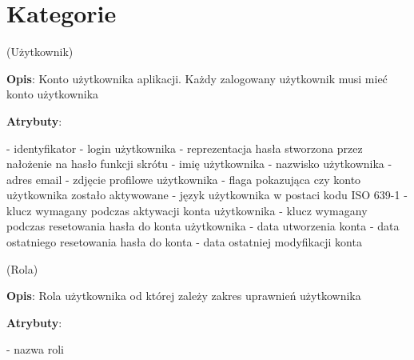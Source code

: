 \section{Kategorie}\label{sec:categories}

\begin{enumerate}[label={\textbf{KAT/\protect\threedigits{\theenumi}}}, wide, labelwidth=!, labelindent=0pt, labelsep=0pt, series=reqs]
    \setlength\itemsep{1em}
     \label{kat:User} (Użytkownik)

    \textbf{Opis}: Konto użytkownika aplikacji. Każdy zalogowany użytkownik musi mieć konto użytkownika
    \par
    \textbf{Atrybuty}:
    \begin{itemize}[series=atr, wide, align=left, leftmargin=5cm]
         \label{kat:User:id} - identyfikator
         \label{kat:User:login} - login użytkownika
         \label{kat:User:passwordHash} - reprezentacja hasła stworzona przez nałożenie na hasło funkcji skrótu
         \label{kat:User:firstName} - imię użytkownika
         \label{kat:User:lastName} - nazwisko użytkownika
         \label{kat:User:email} - adres email
         \label{kat:User:image} - zdjęcie profilowe użytkownika
         \label{kat:User:activated} - flaga pokazująca czy konto użytkownika zostało aktywowane
         \label{kat:User:language} - język użytkownika w postaci kodu ISO 639-1
         \label{kat:User:activationKey} - klucz wymagany podczas aktywacji konta użytkownika
         \label{kat:User:resetKey} - klucz wymagany podczas resetowania hasła do konta użytkownika
         \label{kat:User:createdDate} - data utworzenia konta
         \label{kat:User:resetDate} - data ostatniego resetowania hasła do konta
         \label{kat:User:lastModifiedDate} - data ostatniej modyfikacji konta
    \end{itemize}

     \label{kat:Authority} (Rola)

    \textbf{Opis}: Rola użytkownika od której zależy zakres uprawnień użytkownika
    \par
    \textbf{Atrybuty}:
    \begin{itemize}[series=atr, wide, align=left, leftmargin=5cm]
         \label{kat:Authority:name} - nazwa roli
    \end{itemize}


\end{enumerate}
